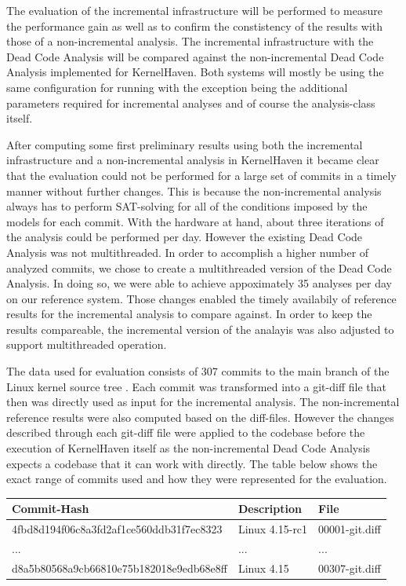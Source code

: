 \documentclass[a4paper]{article}
\begin{document}
The evaluation of the incremental infrastructure will be performed to measure the performance gain as well as to confirm the constistency of the results with those of a non-incremental analysis. The incremental infrastructure with the Dead Code Analysis will be compared against the non-incremental Dead Code Analysis implemented for KernelHaven. Both systems will mostly be using the same configuration for running with the exception being the additional parameters required for incremental analyses and of course the analysis-class itself.

After computing some first preliminary results using both the incremental infrastructure and a non-incremental analysis in KernelHaven it became clear that the evaluation could not be performed for a large set of commits in a timely manner without further changes. This is because the non-incremental analysis always has to perform SAT-solving for all of the conditions imposed by the models for each commit. With the hardware at hand, about three iterations of the analysis could be performed per day. However the existing Dead Code Analysis was not multithreaded. In order to accomplish a higher number of analyzed commits, we chose to create a multithreaded version of the Dead Code Analysis. In doing so, we were able to achieve appoximately 35 analyses per day on our reference system. Those changes enabled the timely availabily of reference results for the incremental analysis to compare against. In order to keep the results compareable, the incremental version of the analayis was also adjusted to support multithreaded operation. 

The data used for evaluation consists of 307 commits to the main branch of the Linux kernel source tree \cite{linux}. Each commit was transformed into a git-diff file that then was directly used as input for the incremental analysis. The non-incremental reference results were also computed based on the diff-files. However the changes described through each git-diff file were applied to the codebase before the execution of KernelHaven itself as the non-incremental Dead Code Analysis expects a codebase that it can work with directly. The table below shows the exact range of commits used and how they were represented for the evaluation.

\begin{tabular}{l | l | l}
	Commit-Hash & Description & File \\ \hline
	4fbd8d194f06c8a3fd2af1ce560ddb31f7ec8323 & Linux 4.15-rc1 & 00001-git.diff \\
	... & ... & ... \\
	d8a5b80568a9cb66810e75b182018e9edb68e8ff & Linux 4.15  & 00307-git.diff \\
\end{tabular}
\end{document}

